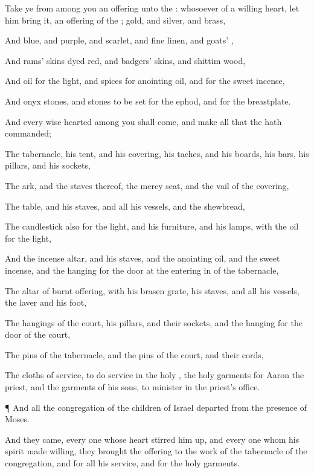 {Take ye from among you an
offering unto the
{}:
whosoever
{} of a
willing
heart, let him
bring it, an
offering of the
{};
gold, and
silver, and
brass,

And
blue, and
purple, and
scarlet, and fine
linen, and
goats’
{},

And
rams’
skins dyed
red, and
badgers’
skins, and
shittim
wood,

And
oil for the
light, and
spices for
anointing
oil, and for the
sweet
incense,

And
onyx
stones, and
stones to be
set for the
ephod, and for the
breastplate.

And every
wise
hearted among you shall
come, and
make all that the
{} hath
commanded;

The
tabernacle, his
tent, and his
covering, his
taches, and his
boards, his
bars, his
pillars, and his
sockets,

The
ark, and the
staves thereof,
{} the mercy
seat, and the
vail of the
covering,

The
table, and his
staves, and all his
vessels, and the
shewbread,

The
candlestick also for the
light, and his
furniture, and his
lamps, with the
oil for the
light,

And the
incense
altar, and his
staves, and the
anointing
oil, and the
sweet
incense, and the
hanging for the door at the entering
in of the
tabernacle,

The
altar of burnt
offering, with his
brasen
grate, his
staves, and all his
vessels, the
laver and his
foot,

The
hangings of the
court, his
pillars, and their
sockets, and the
hanging for the
door of the
court,

The
pins of the
tabernacle, and the
pins of the
court, and their
cords,

The
cloths of
service, to do
service in the
holy
{}, the
holy
garments for
Aaron the
priest, and the
garments of his
sons, to minister in the
priest’s office.


\par }{\PP {}¶ And all the
congregation of the
children of
Israel
departed from the
presence of
Moses.

And they
came, every
one
whose
heart stirred him
up, and every one whom his
spirit made
willing,
{} they
brought the
{}
offering to the
work of the
tabernacle of the
congregation, and for all his
service, and for the
holy
garments.

}
